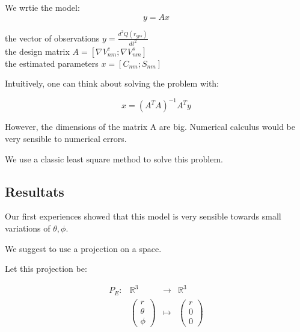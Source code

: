 \documentclass{article}
\begin{document}
We wrtie the model:
\begin{equation}
    y = A x    
\end{equation}

the vector of observations $y = \frac{d^2 Q(r_{gps})}{dt^2}$\\

the design matrix $A = \left[ \nabla V_{nm}^c ; \nabla V_{nm}^s \right]  $\\

the estimated parameters $x= \left[C_{nm} ; S_{nm}\right]$ 

Intuitively, one can think about solving the problem with: 

\begin{equation*}
    x = (A^TA)^{-1} A^T y
\end{equation*}

However, the dimensions of the matrix A are big. Numerical calculus would be very sensible to numerical errors. 

We use a classic least square method to solve this problem. 
\subsection{Resultats}
Our first experiences showed that this model is very sensible towards small variations of $\theta ,  \phi$.

We suggest to use a projection on a space. 

Let this projection be: 

\begin{equation}
    \begin{array}{l|rcl}
        P_E : & \mathbb{R}^3 & \longrightarrow &\mathbb{R}^3   \\
            
        & \left(\begin{array}{ll}
                r \\
                \theta \\
                \phi
                \end{array}
            \right )   & \longmapsto & \left(
                \begin{array}{ll}
                r \\
                0 \\
                0
                \end{array}
            \right ) \end{array}
\end{equation}
\end{document}
